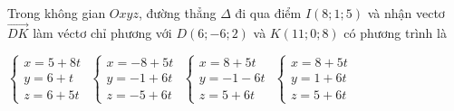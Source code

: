 \documentclass[12pt,a4paper]{article}
\begin{document}
\begin{ex}
 Trong không gian ${Oxyz}$, đường thẳng ${\Delta}$ đi qua điểm ${I(8;1;5)}$ và nhận vectơ $\overrightarrow{DK}$ làm véctơ chỉ phương với $D(6;-6;2)$ và $K(11;0;8)$ có phương trình là
 
\choice
{ $\left\{ \begin{array}{l}x = 5+8t\\ y = 6+t\\z = 6+5t\end{array} \right.$ }
   { $\left\{ \begin{array}{l}x = -8+5t\\ y = -1+6t\\z = -5+6t\end{array} \right.$ }
     { $\left\{ \begin{array}{l}x = 8+5t\\ y = -1-6t\\z = 5+6t\end{array} \right.$ }
    { \True $\left\{ \begin{array}{l}x = 8+5t\\ y = 1+6t\\z = 5+6t\end{array} \right.$ }
\end{ex}
\end{document}
